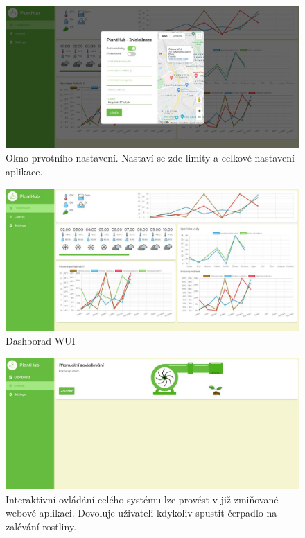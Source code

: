 \documentclass[12pt,a4paper]{article}
\begin{document}
\begin{figure}[h]
	\centering
	\includegraphics[width=\linewidth]{ui-inicializace.jpg}
	\caption{Okno prvotního nastavení. Nastaví se zde limity a celkové
		nastavení aplikace.}
\end{figure}

\begin{figure}[h]
	\centering
	\includegraphics[width=\linewidth]{web-ui.png}
	\caption{Dashborad \ac{WUI}}
\end{figure}

\begin{figure}[h]
	\centering
	\includegraphics[width=\linewidth]{web-ui-pump.png}
	\caption{Interaktivní ovládání celého systému lze provést v již
		zmiňované webové aplikaci. Dovoluje uživateli kdykoliv spustit
		čerpadlo na
		zalévání rostliny.}
\end{figure}
\end{document}
